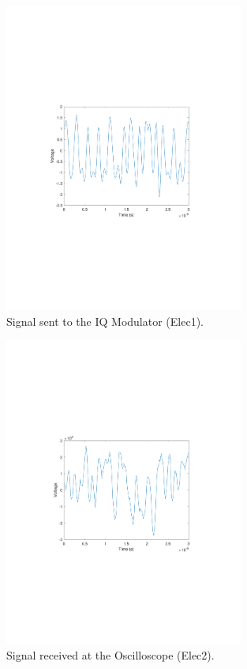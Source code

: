 \begin{refsection}
\begin{figure}[H]
	\centering
	\includegraphics[clip, trim=4cm 8cm 4cm 8cm, width=0.7\textwidth]{./sdf/m_qam_system/figures/exp/TX_03.pdf}
	\caption{Signal sent to the IQ Modulator (Elec1).}
	\label{fig:qamTxSig}
\end{figure}

\begin{figure}[H]
\centering
\includegraphics[clip, trim=4cm 8cm 4cm 8cm, width=0.7\textwidth]{./sdf/m_qam_system/figures/exp/RX_03.pdf}
\caption{Signal received at the Oscilloscope (Elec2).}
\label{fig:qamRxSig}
\end{figure}


\end{refsection}
